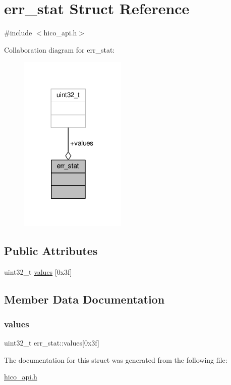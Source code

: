 \hypertarget{structerr__stat}{}\section{err\+\_\+stat Struct Reference}
\label{structerr__stat}


{\ttfamily \#include $<$hico\+\_\+api.\+h$>$}



Collaboration diagram for err\+\_\+stat\+:\nopagebreak
\begin{figure}[H]
\begin{center}
\leavevmode
\includegraphics[width=144pt]{structerr__stat__coll__graph}
\end{center}
\end{figure}
\subsection*{Public Attributes}
\begin{DoxyCompactItemize}
\item 
uint32\+\_\+t \hyperlink{structerr__stat_a659e627af5963248da109c8e2404cd08}{values} \mbox{[}0x3f\mbox{]}
\end{DoxyCompactItemize}


\subsection{Member Data Documentation}
\mbox{\label{structerr__stat_a659e627af5963248da109c8e2404cd08}} 
\subsubsection{\texorpdfstring{values}{values}}
{\footnotesize\ttfamily uint32\+\_\+t err\+\_\+stat\+::values\mbox{[}0x3f\mbox{]}}



The documentation for this struct was generated from the following file\+:\begin{DoxyCompactItemize}
\item 
\hyperlink{hico__api_8h}{hico\+\_\+api.\+h}\end{DoxyCompactItemize}
